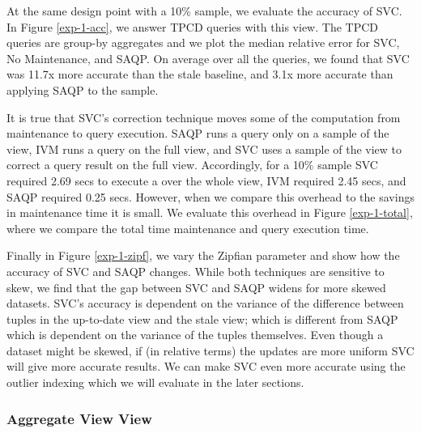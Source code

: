 At the same design point with a 10\% sample, we evaluate the accuracy of SVC.
In Figure \ref{exp-1-acc}, we answer TPCD queries with this view.
The TPCD queries are group-by aggregates and we plot the median relative error for SVC, No Maintenance, and SAQP.
On average over all the queries, we found that SVC was 11.7x more accurate than the stale baseline, and 3.1x more accurate than applying SAQP to the sample.

It is true that SVC's correction technique moves some of the computation from maintenance to query execution.
SAQP runs a query only on a sample of the view, IVM runs a query on the full view, and SVC uses a sample of the view to correct a query result on the full view.
Accordingly, for a 10\% sample SVC required 2.69 secs to execute a \sumfunc over the whole view, IVM required 2.45 secs, and  SAQP required 0.25 secs.
However, when we compare this overhead to the savings in maintenance time it is small.
We evaluate this overhead in Figure \ref{exp-1-total}, where we compare the total time maintenance and query execution time.

Finally in Figure \ref{exp-1-zipf}, we vary the Zipfian parameter and show how the accuracy of SVC and SAQP changes.
While both techniques are sensitive to skew, we find that the gap between SVC and SAQP widens for more skewed datasets. 
SVC's accuracy is dependent on the variance of the difference between tuples in the up-to-date view and the stale view; which is different from SAQP which is dependent on the variance of the tuples themselves. 
Even though a dataset might be skewed, if (in relative terms) the updates are more uniform SVC will give more accurate results.
We can make SVC even more accurate using the outlier indexing which we will evaluate in the later sections.

\subsubsection{Aggregate View View}
\label{exp-datacube}

